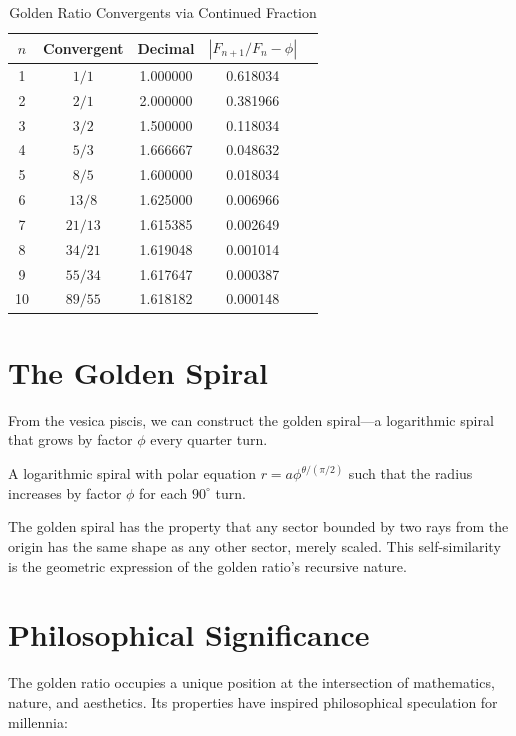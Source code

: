 \begin{table}[H]
\centering
\caption{Golden Ratio Convergents via Continued Fraction}
\begin{tabular}{ccccc}
\toprule
$n$ & Convergent & Decimal & $|F_{n+1}/F_n - \phi|$ \\
\midrule
1 & $1/1$ & 1.000000 & 0.618034 \\
2 & $2/1$ & 2.000000 & 0.381966 \\
3 & $3/2$ & 1.500000 & 0.118034 \\
4 & $5/3$ & 1.666667 & 0.048632 \\
5 & $8/5$ & 1.600000 & 0.018034 \\
6 & $13/8$ & 1.625000 & 0.006966 \\
7 & $21/13$ & 1.615385 & 0.002649 \\
8 & $34/21$ & 1.619048 & 0.001014 \\
9 & $55/34$ & 1.617647 & 0.000387 \\
10 & $89/55$ & 1.618182 & 0.000148 \\
\bottomrule
\end{tabular}
\end{table}

\section{The Golden Spiral}

From the vesica piscis, we can construct the golden spiral—a logarithmic spiral that grows by factor $\phi$ every quarter turn.

\begin{definition}
A logarithmic spiral with polar equation $r = a\phi^{\theta/(\pi/2)}$ such that the radius increases by factor $\phi$ for each $90^\circ$ turn.
\end{definition}

The golden spiral has the property that any sector bounded by two rays from the origin has the same shape as any other sector, merely scaled. This self-similarity is the geometric expression of the golden ratio's recursive nature.

\section{Philosophical Significance}

The golden ratio occupies a unique position at the intersection of mathematics, nature, and aesthetics. Its properties have inspired philosophical speculation for millennia:

